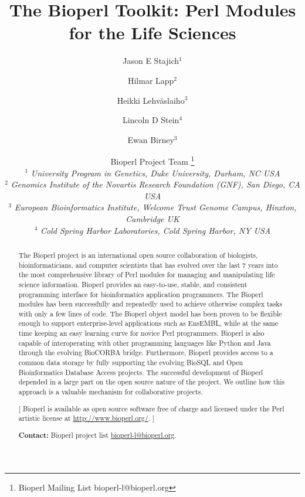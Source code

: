 \documentclass[12pt]{article}
\begin{document}
\doublespacing
\title{The Bioperl Toolkit: Perl Modules for the Life Sciences}
\author{Jason E Stajich$^1$ \and
Hilmar Lapp$^2$ \and
Heikki Lehv\"{a}slaiho$^3$ \and 
Lincoln D Stein$^4$ \and Ewan Birney$^3$ \and
Bioperl Project Team \thanks{Bioperl Mailing List bioperl-l@bioperl.org} \\
$^1$ \small{\textit{University Program in Genetics, Duke University,  Durham, NC USA}} \\
$^2$ \small{\textit{Genomics Institute of the Novartis Research
Foundation (GNF), San Diego, CA USA}} \\
$^3$ \small{\textit{European Bioinformatics Institute, Welcome Trust
Genome Campus, Hinxton, Cambridge UK}} \\
$^4$ \small{\textit{Cold Spring Harbor Laboratories, Cold Spring Harbor, NY USA }}\\
}
\maketitle
\begin{abstract}

The Bioperl project is an international open source collaboration of
biologists, bioinformaticians, and computer scientists that has
evolved over the last 7 years into the most comprehensive library of
Perl modules for managing and manipulating life science information.
Bioperl provides an easy-to-use, stable, and consistent programming
interface for bioinformatics application programmers.  The Bioperl
modules has been successfully and repeatedly used to achieve otherwise
complex tasks with only a few lines of code.  The Bioperl object model
has been proven to be flexible enough to support enterprise-level
applications such as EnsEMBL, while at the same time keeping an easy
learning curve for novice Perl programmers.  Bioperl is also capable
of interoperating with other programming languages like Python and
Java through the evolving BioCORBA bridge. 
Furthermore, Bioperl provides access to a common data storage by fully
supporting the evolving BioSQL and Open Bioinformatics Database Access
projects. 
The successful development of Bioperl depended in a large
part on the open source nature of the project. We outline how this
approach is a valuable mechanism for collaborative projects.

[ Bioperl is available as open source software free of charge and
licensed under the Perl artistic license at \url{http://www.bioperl.org/}. ]

\textbf{Contact:} Bioperl project list \url{bioperl-l@bioperl.org}.

\end{abstract}
\end{document}

